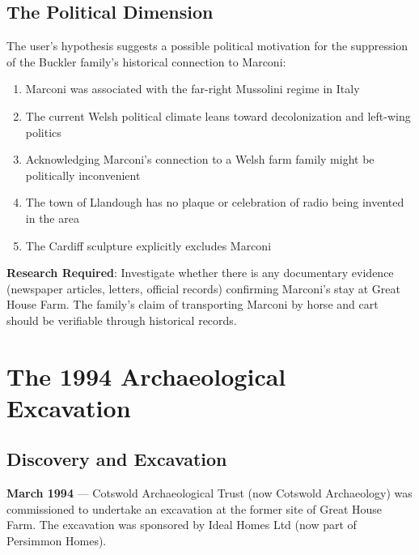 \documentclass[11pt,a4paper]{article}
\begin{document}
\subsection{The Political Dimension}

The user's hypothesis suggests a possible political motivation for the suppression of the Buckler family's historical connection to Marconi:

\begin{enumerate}[label=\arabic*.]
    \item Marconi was associated with the far-right Mussolini regime in Italy
    \item The current Welsh political climate leans toward decolonization and left-wing politics
    \item Acknowledging Marconi's connection to a Welsh farm family might be politically inconvenient
    \item The town of Llandough has no plaque or celebration of radio being invented in the area
    \item The Cardiff sculpture explicitly excludes Marconi
\end{enumerate}

\begin{action}
\textbf{Research Required}: Investigate whether there is any documentary evidence (newspaper articles, letters, official records) confirming Marconi's stay at Great House Farm. The family's claim of transporting Marconi by horse and cart should be verifiable through historical records.
\end{action}

\newpage

\section{The 1994 Archaeological Excavation}

\subsection{Discovery and Excavation}

\begin{timeline}
\textbf{March 1994} --- Cotswold Archaeological Trust (now Cotswold Archaeology) was commissioned to undertake an excavation at the former site of Great House Farm. The excavation was sponsored by Ideal Homes Ltd (now part of Persimmon Homes).
\end{timeline}
\end{document}
